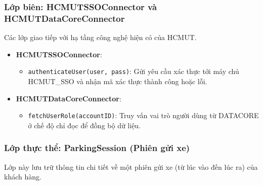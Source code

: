\subsubsection{Lớp biên: HCMUTSSOConnector và HCMUTDataCoreConnector}
Các lớp giao tiếp với hạ tầng công nghệ hiện có của HCMUT.

\begin{itemize}
    \item \textbf{HCMUTSSOConnector}: 
    \begin{itemize}
        \item \texttt{authenticateUser(user, pass)}: Gửi yêu cầu xác thực tới máy chủ HCMUT\_SSO và nhận mã xác thực thành công hoặc lỗi.
    \end{itemize}
    \item \textbf{HCMUTDataCoreConnector}:
    \begin{itemize}
        \item \texttt{fetchUserRole(accountID)}: Truy vấn vai trò người dùng từ DATACORE ở chế độ chỉ đọc để đồng bộ dữ liệu.
    \end{itemize}
\end{itemize}



\subsubsection{Lớp thực thể: ParkingSession (Phiên gửi xe)}
Lớp này lưu trữ thông tin chi tiết về một phiên gửi xe (từ lúc vào đến lúc ra) của khách hàng.

